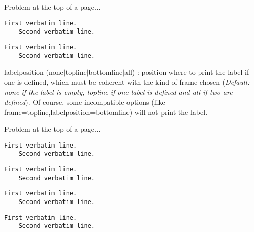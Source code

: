 \documentclass[twoside]{article}
\providecommand\optname[1]{\textsf{#1}}
\newenvironment{optlist}{\begin{description}%
  \renewcommand\makelabel[1]{%
    \descriptionlabel{\mdseries\optname{##1}}}%
  \itemsep0.25\itemsep}%
 {\end{description}}
\begin{document}
 Problem at the top of a page...

\begin{SideBySideExample}
  \begin{Verbatim}[frame=single,
                   label=My text]
    First verbatim line.
    Second verbatim line.
  \end{Verbatim}

  \begin{Verbatim}[frame=topline,
      framesep=4mm,
      label=\fbox{\Large\emph{The code}}]
    First verbatim line.
    Second verbatim line.
  \end{Verbatim}
\end{SideBySideExample}

\begin{optlist}
  \item[labelposition (none$\mid$topline$\mid$bottomline$\mid$all)]:
  position where to print the label if one is defined, which must be
  coherent with the kind of frame chosen
  (\emph{Default: none if the label is empty, topline if one label is
  defined and all if two are defined}).
  Of course, some incompatible options (like
  \textsf{frame=topline,labelposition=bottomline}) will not print the
  label.
\end{optlist}

 Problem at the top of a page...

\begin{SideBySideExample}
  \begin{Verbatim}[frame=single,
         framesep=2mm,
         label=Text,labelposition=all]
    First verbatim line.
    Second verbatim line.
  \end{Verbatim}

  \begin{Verbatim}[frame=lines,
         label=Text,labelposition=topline]
    First verbatim line.
    Second verbatim line.
  \end{Verbatim}
\end{SideBySideExample}

\begin{SideBySideExample}
  \begin{Verbatim}[frame=bottomline,
         framesep=3mm,
         label=\textit{Code included},
         labelposition=bottomline]
    First verbatim line.
    Second verbatim line.
  \end{Verbatim}

  \begin{Verbatim}[frame=lines,
                   framesep=3mm,
   label={[Beginning of code]End of code}]
    First verbatim line.
    Second verbatim line.
  \end{Verbatim}
\end{SideBySideExample}
\end{document}

